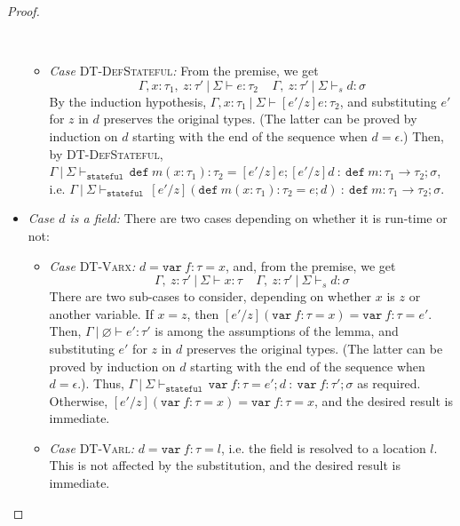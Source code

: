 \documentclass{llncs}
\newcommand{\keywadj}[1]{\mathtt{#1}}
\newcommand{\keyw}[1]{\keywadj{#1}~}
\begin{document}
\begin{proof}
\begin{pcases}
\begin{itemize}
\begin{itemize}
\\
\item[] \textit{Case} \textsc{DT-DefStateful}\textit{:} From the premise, we get
\[
\Gamma, x : \tau_1,~z : \tau'~|~\Sigma \vdash e : \tau_2~~~~~\Gamma,~z : \tau'~|~\Sigma \vdash_s d : \sigma
\]
By the induction hypothesis, $\Gamma, x : \tau_1~|~\Sigma \vdash [e'/z]e : \tau_2$, and substituting $e'$ for $z$ in $d$ preserves the original types. (The latter can be proved by induction on $d$ starting with the end of the sequence when $d = \epsilon$.) Then, by \textsc{DT-DefStateful}, $\Gamma~|~\Sigma \vdash_{\keyw{stateful}} \keyw{def} m(x : \tau_1) : \tau_2 = [e'/z]e; [e'/z]d~:~\keyw{def} m : \tau_1 \rightarrow \tau_2; \sigma$, i.e. $\Gamma~|~\Sigma \vdash_{\keyw{stateful}} [e'/z](\keyw{def} m(x : \tau_1) : \tau_2 = e; d)~:~\keyw{def} m : \tau_1 \rightarrow \tau_2; \sigma$.
\\
\end{itemize}


\item[] \textit{Case $d$ is a field:} There are two cases depending on whether it is run-time or not:
\\
\begin{itemize}
\item[] \textit{Case} \textsc{DT-Varx}\textit{:} $d = \keyw{var} f : \tau = x$, and, from the premise, we get
\[
\Gamma,~z : \tau'~|~\Sigma \vdash x : \tau~~~~~\Gamma,~z : \tau'~|~\Sigma \vdash_s d : \sigma
\]
There are two sub-cases to consider, depending on whether $x$ is $z$ or another variable. If $x = z$, then $[e'/z](\keyw{var} f : \tau = x) = \keyw{var} f : \tau = e'$. Then, $\Gamma~|~\varnothing \vdash e' : \tau'$ is among the assumptions of the lemma, and substituting $e'$ for $z$ in $d$ preserves the original types. (The latter can be proved by induction on $d$ starting with the end of the sequence when $d = \epsilon$.). Thus, $\Gamma~|~\Sigma \vdash_{\keyw{stateful}} \keyw{var} f : \tau = e'; d~:~\keyw{var} f : \tau'; \sigma$ as required. Otherwise, $[e'/z](\keyw{var} f : \tau = x) = \keyw{var} f : \tau = x$, and the desired result is immediate.
\\
\item[] \textit{Case} \textsc{DT-Varl}\textit{:} $d = \keyw{var} f : \tau = l$, i.e. the field is resolved to a location $l$. This is not affected by the substitution, and the desired result is immediate.
\\
\end{itemize}

\end{itemize}


\end{pcases}
\end{proof}
\end{document}
